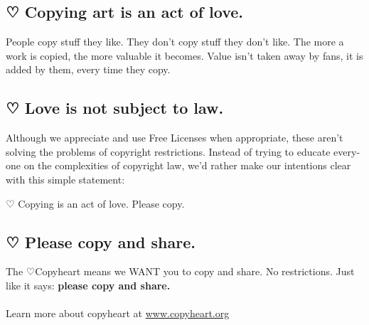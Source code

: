 \newpage
\begin{english}

\subsection*{ {\dejavu ♡} Copying art is an act of love.}

People copy stuff they like. They don’t copy stuff they don’t like. The more a work is copied, the more valuable it becomes. Value isn’t taken away by fans, it is added by them, every time they copy.

\subsection*{ {\dejavu ♡} Love is not subject to law.}

Although we appreciate and use Free Licenses when appropriate, these aren’t solving the problems of copyright restrictions. Instead of trying to educate everyone on the complexities of copyright law, we’d rather make our intentions clear with this simple statement:

\begin{framed}
   \begin{center} {\dejavu ♡} Copying is an act of love. Please copy. \end{center}
\end{framed}

\subsection*{ {\dejavu ♡} Please copy and share.}

The {\dejavu ♡}Copyheart means we WANT you to copy and share. No restrictions. Just like it says: \textbf{please copy and share.}\\
 \\
Learn more about copyheart at \url{www.copyheart.org}
\end{english}
